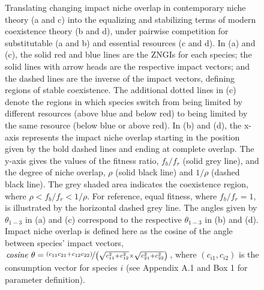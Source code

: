 \newpage
\begin{figure}[h!]
\centering
{}
\caption[Translating changing impact niche overlap in contemporary niche theory into the equalizing and stabilizing terms of modern coexistence theory, under pairwise competition for substitutable and essential resources.]
	{\hspace{1mm}Translating changing impact niche overlap in contemporary niche theory (a and c) into the equalizing and stabilizing terms of modern coexistence theory (b and d), under pairwise competition for substitutable (a and b) and essential resources (c and d). In (a) and (c), the solid red and blue lines are the ZNGIs for each species; the solid lines with arrow heads are the respective impact vectors; and the dashed lines are the inverse of the impact vectors, defining regions of stable coexistence. The additional dotted lines in (c) denote the regions in which species switch from being limited by different resources (above blue and below red) to being limited by the same resource (below blue or above red). In (b) and (d), the x-axis represents the impact niche overlap starting in the position given by the bold dashed lines and ending at complete overlap. The y-axis gives the values of the fitness ratio, $f_{b}/f_{r}$ (solid grey line), and the degree of niche overlap, $\rho$ (solid black line) and $1/\rho$ (dashed black line). The grey shaded area indicates the coexistence region, where $\rho<f_{b}/f_{r}<1/\rho$. For reference, equal fitness, where $f_{b}/f_{r}=1$, is illustrated by the horizontal dashed grey line. The angles given by $\theta_{1-3}$ in (a) and (c) correspond to the respective $\theta_{1-3}$ in (b) and (d). Impact niche overlap is defined here as the cosine of the angle between species' impact vectors, $\mathit{cosine}\ \theta = \nicefrac{\left( c_{11}c_{21}+c_{12}c_{22} \right)}{\left( \sqrt{c_{11}^{2}+c_{12}^{2}}\times \sqrt{c_{21}^{2}+c_{22}^{2}} \right)}$, where $\left (c_{i1}, c_{i2}\right )$ is the consumption vector for species $\mathit{i}$ (see Appendix A.1 and Box 1 for parameter definition).}

\end{figure}
